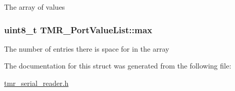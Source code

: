 The array of values \hypertarget{struct_t_m_r___port_value_list_e8259b764d52286cb65d5e36dc6e7ac1}{
\subsubsection[{max}]{\setlength{\rightskip}{0pt plus 5cm}uint8\_\-t {\bf TMR\_\-PortValueList::max}}}
\label{struct_t_m_r___port_value_list_e8259b764d52286cb65d5e36dc6e7ac1}


The number of entries there is space for in the array 

The documentation for this struct was generated from the following file:\begin{CompactItemize}
\item 
\hyperlink{tmr__serial__reader_8h}{tmr\_\-serial\_\-reader.h}\end{CompactItemize}
